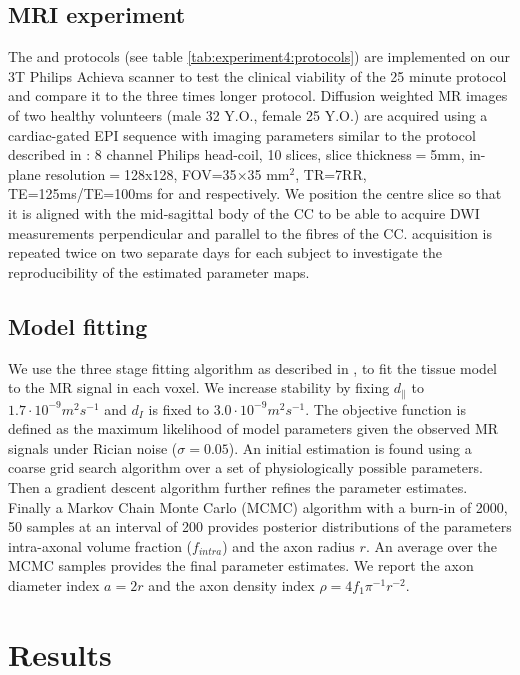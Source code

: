 \subsection*{MRI experiment}
The \SFshort{} and \OIlong{} protocols (see table \ref{tab:experiment4:protocols}) are implemented on our 3T Philips Achieva scanner to test the clinical viability of the 25 minute \SFshort{} protocol and compare it to the three times longer \OIlong{} protocol. Diffusion weighted MR images of two healthy volunteers (male 32 Y.O., female 25 Y.O.) are acquired using a cardiac-gated EPI sequence with imaging parameters similar to the protocol described in \citet{Alexander:2010}: 8 channel Philips head-coil, 10 slices, slice thickness$=$5mm, in-plane resolution$=$128x128, \gls{FOV}=35$\times$35 mm$^2$, TR=7RR, TE=125ms/TE=100ms for \SFshort{} and \OIlong{} respectively. We position the centre slice so that it is aligned with the mid-sagittal body of the \gls{CC} to be able to acquire DWI measurements perpendicular and parallel to the fibres of the \gls{CC}. \SFshort{} acquisition is repeated twice on two separate days for each subject to investigate the reproducibility of the estimated parameter maps.
%
\subsection*{Model fitting}
We use the three stage fitting algorithm as described in \citet{Alexander:2010}, to fit the tissue model to the  MR signal in each voxel. We increase stability by fixing $d_\parallel$ to $1.7\cdot 10^{-9} m^2s^{-1}$ and $d_I$ is fixed to $3.0\cdot 10^{-9} m^2s^{-1}$\citep{Assaf:2008,Barazany:2009,Alexander:2010}. The objective function is defined as the maximum likelihood of model parameters given the observed MR signals under Rician noise ($\sigma=0.05$). An initial estimation is found using a coarse grid search algorithm over a set of physiologically possible parameters. Then a gradient descent algorithm further refines the parameter estimates. Finally a Markov Chain Monte Carlo (MCMC) algorithm with a burn-in of 2000, 50 samples at an interval of 200 provides posterior distributions of the parameters intra-axonal volume fraction ($f_{intra}$) and the axon radius $r$. An average over the MCMC samples provides the final parameter estimates. We report the axon diameter index $a=2r$ and the axon density index $\rho=4f_1\pi^{-1}r^{-2}$.
\section{Results}
